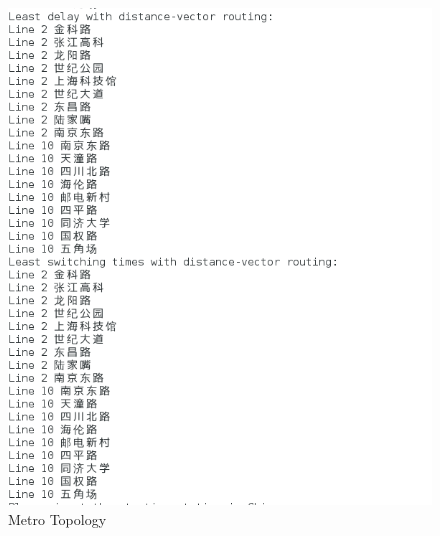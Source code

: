 \documentclass[12pt]{article}
\begin{document}
\begin{figure}[H]
	\begin{center}
		\includegraphics[width=1\textwidth]{figures/2}
	\end{center}
	\caption{Metro Topology}
	\label{1}
\end{figure}
\end{document}
